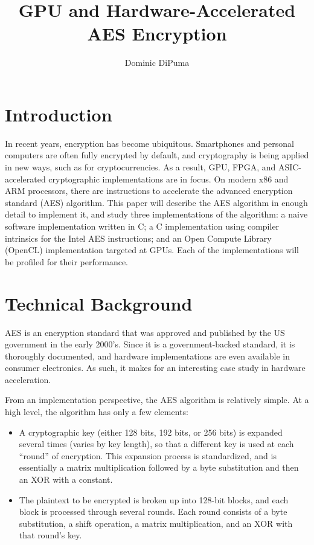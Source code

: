 \documentclass[a4paper,10pt]{article}
\title{GPU and Hardware-Accelerated AES Encryption}
\author{Dominic DiPuma}
\begin{document}
\maketitle

\section{Introduction}

In recent years, encryption has become ubiquitous.  Smartphones and personal computers are often fully encrypted by default, and cryptography is being applied in new ways, such as for cryptocurrencies.  As a result, GPU, FPGA, and ASIC-accelerated cryptographic implementations are in focus.  On modern x86 and ARM processors, there are instructions to accelerate the advanced encryption standard (AES) algorithm.  This paper will describe the AES algorithm in enough detail to implement it, and study three implementations of the algorithm: a naive software implementation written in C; a C implementation using compiler intrinsics for the Intel AES instructions; and an Open Compute Library (OpenCL) implementation targeted at GPUs.  Each of the implementations will be profiled for their performance.

\section{Technical Background}

AES is an encryption standard that was approved and published by the US government in the early 2000's.  Since it is a government-backed standard, it is thoroughly documented, and hardware implementations are even available in consumer electronics.  As such, it makes for an interesting case study in hardware acceleration.

From an implementation perspective, the AES algorithm is relatively simple.  At a high level, the algorithm has only a few elements:
\begin{itemize}
 \item A cryptographic key (either 128 bits, 192 bits, or 256 bits) is expanded several times (varies by key length), so that a different key is used at each ``round'' of encryption.  This expansion process is standardized, and is essentially a matrix multiplication followed by a byte substitution and then an XOR with a constant.
 \item The plaintext to be encrypted is broken up into 128-bit blocks, and each block is processed through several rounds.  Each round consists of a byte substitution, a shift operation, a matrix multiplication, and an XOR with that round's key.
\end{itemize}
\end{document}
